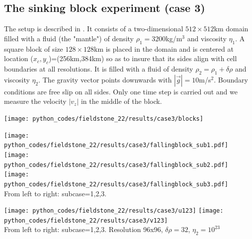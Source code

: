 

\subsection*{The sinking block experiment (case 3)} 

The setup is described in \cite{thba22}. 
It consists of a two-dimensional $512\times 512$km domain filled with a fluid (the "mantle") 
of density $\rho_1=3200$kg/m$^3$ and viscosity $\eta_1$. A square block of 
size $128\times 128$km is placed in the domain and is centered at location 
($x_c,y_c$)=(256km,384km) so as to insure that its sides align with cell boundaries at 
all resolutions. It is filled with a fluid of density $\rho_2=\rho_1+\delta \rho$ 
and viscosity $\eta_2$. The gravity vector points downwards with $|\vec{g}|=10$m/s$^2$. 
Boundary conditions are free slip on all sides. Only one time step is carried out and 
we measure the velocity $|v_z|$ in the middle of the block. 

\begin{center}
\texttt{[image: python\_codes/fieldstone\_22/results/case3/blocks]}
\end{center}

\begin{center}
\texttt{[image: python\_codes/fieldstone\_22/results/case3/fallingblock\_sub1.pdf]}
\texttt{[image: python\_codes/fieldstone\_22/results/case3/fallingblock\_sub2.pdf]}
\texttt{[image: python\_codes/fieldstone\_22/results/case3/fallingblock\_sub3.pdf]}\\
{\captionfont From left to right: subcase=1,2,3.}
\end{center}

\begin{center}
\texttt{[image: python\_codes/fieldstone\_22/results/case3/u123]}
\texttt{[image: python\_codes/fieldstone\_22/results/case3/v123]}\\
{\captionfont From left to right: subcase=1,2,3. 
Resolution 96x96, $\delta \rho=32$, $\eta_2=10^{23}$}
\end{center}





